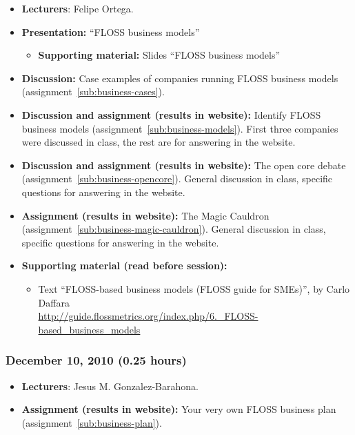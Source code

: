 \documentclass[a4paper]{article}
\begin{document}
\begin{itemize}
\item \textbf{Lecturers}: Felipe Ortega.
\item \textbf{Presentation:} ``FLOSS business models''
  \begin{itemize}
  \item \textbf{Supporting material:} Slides ``FLOSS business models''
  \end{itemize}
\item \textbf{Discussion:} Case examples of companies running FLOSS business models (assignment~\ref{sub:business-cases}).
\item \textbf{Discussion and assignment (results in website):} Identify FLOSS
business models (assignment~\ref{sub:business-models}). First three companies were discussed in class, the rest are for answering in the website.
\item \textbf{Discussion and assignment (results in website):} The open core debate (assignment~\ref{sub:business-opencore}). General discussion in class, specific questions for answering in the website.
\item \textbf{Assignment (results in website):} The Magic Cauldron (assignment~\ref{sub:business-magic-cauldron}). General discussion in class, specific questions for answering in the website.
\item \textbf{Supporting material (read before session):}
  \begin{itemize}
  \item Text ``FLOSS-based business models (FLOSS guide for SMEs)'', by Carlo Daffara \\
    \url{http://guide.flossmetrics.org/index.php/6._FLOSS-based_business_models}
  \end{itemize}
\end{itemize}

\subsubsection{December 10, 2010 (0.25 hours)}

\begin{itemize}
\item \textbf{Lecturers}: Jesus M. Gonzalez-Barahona.
\item \textbf{Assignment (results in website):} Your very own FLOSS
  business plan (assignment~\ref{sub:business-plan}).
\end{itemize}
\end{document}
